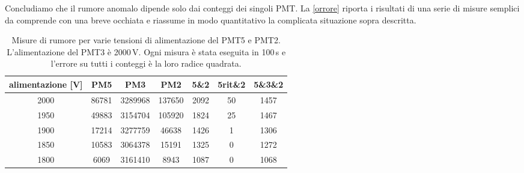Concludiamo che il rumore anomalo dipende solo dai conteggi dei singoli PMT.
La \autoref{orrore} riporta i risultati di una serie di misure semplici da comprende con una breve occhiata e riassume in modo quantitativo la complicata situazione sopra descritta. 

\begin{table}
\centering
\begin{tabular}{c|c|c|c|c|c|c}
\hline
alimentazione [V] & PM5 & PM3 & PM2 & 5\&2 & 5rit\&2 & 5\&3\&2 \\
\hline
2000 & 86781 & 3289968 & 137650 & 2092 & 50 & 1457 \\
1950 & 49883 & 3154704 & 105920 & 1824 & 25 & 1467 \\
1900 & 17214 & 3277759 & 46638 & 1426 & 1 & 1306 \\
1850 & 10583 & 3064378 & 15191 & 1325 & 0 & 1272 \\
1800 & 6069 & 3161410 & 8943 & 1087 & 0 & 1068 \\
\hline
\end{tabular}
\caption{Misure di rumore per varie tensioni di alimentazione del PMT5 e PMT2. L'alimentazione del PMT3 è 2000\,V. Ogni misura è stata eseguita in 100\,s e l'errore su tutti i conteggi è la loro radice quadrata.}
\label{orrore}
\end{table}